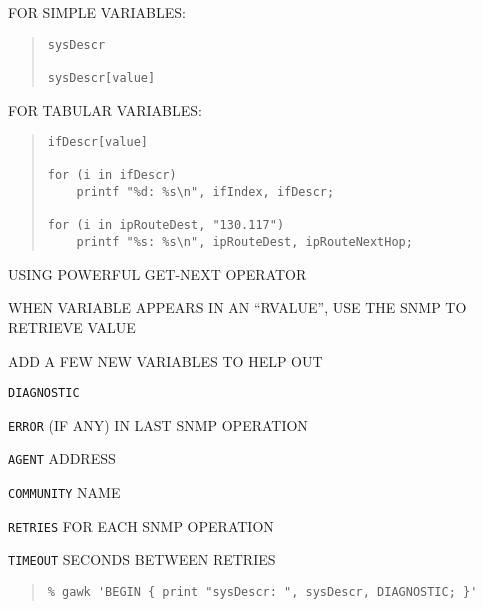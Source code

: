 \begin{bwslide}

\begin{nrtc}
\item	FOR SIMPLE VARIABLES:
\begin{quote}\small\begin{verbatim}
sysDescr

sysDescr[value]
\end{verbatim}\end{quote}

\item	FOR TABULAR VARIABLES:
\begin{quote}\small\begin{verbatim}
ifDescr[value]

for (i in ifDescr)
    printf "%d: %s\n", ifIndex, ifDescr;

for (i in ipRouteDest, "130.117")
    printf "%s: %s\n", ipRouteDest, ipRouteNextHop;
\end{verbatim}\end{quote}
	USING POWERFUL GET-NEXT OPERATOR
\end{nrtc}
\end{bwslide}

\begin{bwslide}

\begin{nrtc}
\item	WHEN VARIABLE APPEARS IN AN ``RVALUE'',
	USE THE SNMP TO RETRIEVE VALUE

\item	ADD A FEW NEW VARIABLES TO HELP OUT
    \begin{nrtc}
    \item	\verb"DIAGNOSTIC"

    \item	\verb"ERROR" (IF ANY) IN LAST SNMP OPERATION

    \item	\verb"AGENT" ADDRESS

    \item	\verb"COMMUNITY" NAME

    \item	\verb"RETRIES" FOR EACH SNMP OPERATION

    \item	\verb"TIMEOUT" SECONDS BETWEEN RETRIES
    \end{nrtc}
\begin{quote}\small\begin{verbatim}
% gawk 'BEGIN { print "sysDescr: ", sysDescr, DIAGNOSTIC; }'
\end{verbatim}\end{quote}
\end{nrtc}
\end{bwslide}


